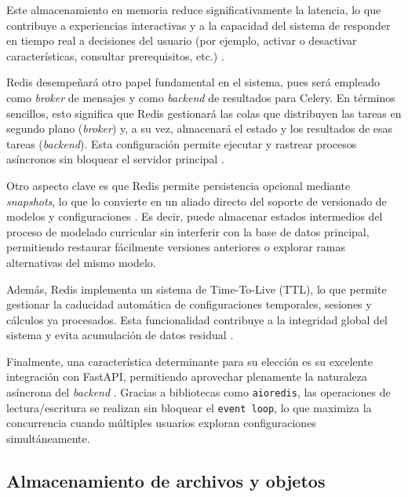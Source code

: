 Este almacenamiento en memoria reduce significativamente la latencia, lo que 
contribuye a experiencias interactivas y a la capacidad del sistema de 
responder en tiempo real a decisiones del usuario (por ejemplo, activar 
o desactivar características, consultar prerequisitos, etc.) \citep{carlson2013redis}.

Redis desempeñará otro papel fundamental en el sistema, pues 
será empleado como \textit{broker} de mensajes y como \textit{backend}
de resultados para Celery. En términos sencillos, esto significa que Redis gestionará las colas que 
distribuyen las tareas en segundo plano (\textit{broker}) y, a su vez, almacenará el estado 
y los resultados de esas tareas (\textit{backend}). 
Esta configuración permite ejecutar y rastrear procesos asíncronos sin bloquear 
el servidor principal \citep{celery2025docs}.

Otro aspecto clave es que Redis permite persistencia opcional mediante 
\textit{snapshots}, lo que lo convierte en un aliado directo del soporte de 
versionado de modelos y configuraciones \citep{carlson2013redis}. Es decir, puede almacenar estados 
intermedios del proceso de modelado curricular sin interferir con la base de 
datos principal, permitiendo restaurar fácilmente versiones anteriores o 
explorar ramas alternativas del mismo modelo.

Además, Redis implementa un sistema de Time-To-Live (\ac{TTL}), lo que permite 
gestionar la caducidad automática de configuraciones temporales, sesiones y 
cálculos ya procesados. Esta funcionalidad contribuye a la integridad global 
del sistema y evita acumulación de datos residual \citep{carlson2013redis}.

Finalmente, una característica determinante para su elección es su excelente 
integración con FastAPI, permitiendo aprovechar plenamente la naturaleza 
asíncrona del \textit{backend} \citep{ramirez2019fastapi}. 
Gracias a bibliotecas como \texttt{aioredis}, las operaciones de 
lectura/escritura se realizan sin bloquear el \texttt{event loop}, lo que maximiza la 
concurrencia cuando múltiples usuarios exploran configuraciones simultáneamente.
            
\subsection{Almacenamiento de archivos y objetos}
        
